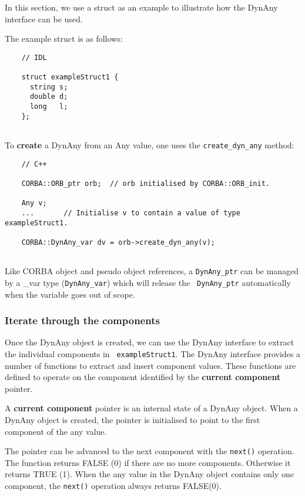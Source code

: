 \documentclass[11pt,twoside,onecolumn]{book}
\begin{document}
In this section, we use a struct as an example to illustrate how the DynAny
interface can be used.

The example struct is as follows:

{\small
\begin{verbatim}
    // IDL
    
    struct exampleStruct1 {
      string s;
      double d;
      long   l;
    };
    
\end{verbatim}
}

To {\bf create} a DynAny from an Any value, one uses the {\tt create\_dyn\_any}
method:

{\small
\begin{verbatim}
    // C++
    
    CORBA::ORB_ptr orb;  // orb initialised by CORBA::ORB_init.
    
    Any v;
    ...       // Initialise v to contain a value of type exampleStruct1.
    
    CORBA::DynAny_var dv = orb->create_dyn_any(v);
    
\end{verbatim}
}

Like CORBA object and pseudo object references, a {\tt DynAny\_ptr} can be
managed by a \_var type ({\tt DynAny\_var}) which will release the {\tt
DynAny\_ptr} automatically when the variable goes out of scope.

\subsubsection{Iterate through the components}
\label{dynanyiterate}

Once the DynAny object is created, we can use the
DynAny interface to extract the individual components in {\tt
exampleStruct1}. The DynAny interface provides a number of
functions to extract and insert component values. These functions are
defined to operate on the component identified by the {\bf current
component} pointer. 

A {\bf current component} pointer is an internal state of a DynAny object.  
When a DynAny object is created, the pointer is initialised to point to the
first component of the any value. 

The pointer can be advanced to the next component with the {\tt next()}
operation. The function returns FALSE (0) if there are no more components.
Otherwise it returns TRUE (1). When the any value in the DynAny object
contains only one component, the {\tt next()} operation always returns
FALSE(0).
\end{document}
